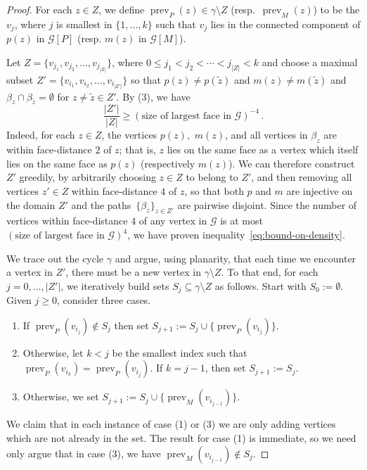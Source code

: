 \documentclass[10pt]{article}
\newcommand{\G}{\mathcal{G}}
\DeclareMathOperator{\prev}{\mbox{prev}}
\begin{document}
\begin{proof}
	For each $z \in Z$, we define $\prev_P(z) \in \gamma \setminus Z$ (resp.\ $\prev_M(z)$) to be the $v_{j}$, where $j$ is smallest in $\{1, \dots, k\}$ such that $v_{j}$ lies in the connected component of $p(z)$ in $\G[P]$ (resp. $m(z)$ in $\G[M]$).
	
	Let $Z = \{v_{j_1}, v_{j_2}, \dots, v_{j_{|Z|}}\}$, where $0 \leq j_1 < j_2 < \cdots < j_{|Z|} < k$
	and choose a maximal subset $Z' = \{v_{i_1}, v_{i_2}, \dots, v_{i_{|Z'|}}\}$ so that $p(z) \neq p(\tilde z)$ and $m(z) \neq m(\tilde z)$ and $\beta_z \cap \beta_{\tilde z} = \emptyset$ for $z \neq \tilde z \in Z'$.
	By (3), we have
	\begin{equation} \label{eq:bound-on-density}
		\frac{|Z'|}{|Z|} \geq {(\mbox{size of largest face in $\G$})}^{-4} \, .
	\end{equation}
	Indeed, for each $z \in Z$, the vertices $p(z)$,~$m(z)$, and all vertices in $\beta_z$ are within face-distance $2$ of $z$; that is, $z$ lies on the same face as a vertex which itself lies on the same face as $p(z)$ (respectively $m(z)$). We can therefore construct $Z'$ greedily, by arbitrarily choosing $z \in Z$ to belong to $Z'$, and then removing all vertices $z' \in Z$ within face-distance $4$ of $z$, so that both $p$ and $m$ are injective on the domain $Z'$
	and the paths~$\{\beta_z\}_{z \in Z'}$ are pairwise disjoint. Since the number of vertices within face-distance $4$ of any vertex in $\G$ is at most $(\mbox{size of largest face in $\G$})^4$, we have proven inequality~\eqref{eq:bound-on-density}.
	
	We trace out the cycle $\gamma$ and argue, using planarity, that each time we encounter a vertex in $Z'$, there must be a new vertex in $\gamma \setminus Z$.  To that end, for each $j = 0, \dots, |Z'|$, we iteratively build sets $S_j \subseteq \gamma \setminus Z$ as follows. Start with $S_0 := \emptyset$. Given $j \geq 0$, consider three cases.
	\begin{enumerate}
		\item If $\prev_P(v_{i_j}) \not\in S_j$ then set $S_{j+1} := S_j \cup \{\prev_P(v_{i_j})\}$.
		\item Otherwise, let $k < j$ be the smallest index such that $\prev_P(v_{i_k}) = \prev_P(v_{i_j})$. If $k = j-1$, then set $S_{j+1} := S_j$.
		\item Otherwise, we set $S_{j+1} := S_j \cup \{\prev_M(v_{i_{j-1}})\}$.
	\end{enumerate}
	
	We claim that in each instance of case (1) or (3) we are only adding vertices which are not already in the set. The result for case (1) is immediate, so we need only argue that in case (3), we have $\prev_M(v_{i_{j-1}}) \not \in S_j$.
	

\end{proof}
\end{document}
